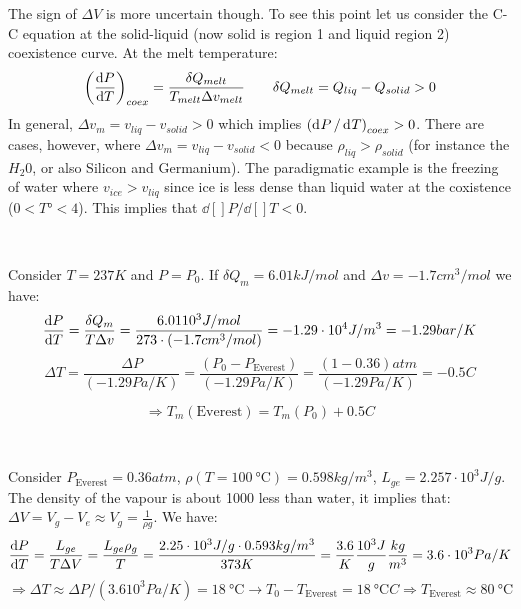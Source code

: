 \documentclass[../main/main.tex]{subfiles}
\begin{document}
The sign of \( \Delta V \) is more uncertain though. To see this point let us consider the C-C equation at the solid-liquid (now solid is region 1 and liquid region 2) coexistence curve.
At the melt temperature:
\begin{equation}
  \qty(\dv{P}{T} )_{coex} = \frac{\delta Q_{melt}}{T_{melt}\Delta v_{melt}} \qquad \delta Q_{melt} = Q_{liq} - Q_{solid} > 0
  \label{eq:}
\end{equation}
In general, \( \Delta v_m = v_{liq} - v_{solid} > 0 \) which implies \( \qty( \dd[]{P}/\dd[]{T}   )_{coex} > 0  \). There are cases, however, where \( \Delta v_m = v_{liq} - v_{solid} < 0 \) because \( \rho_{liq} > \rho _{solid} \) (for instance the \( H_2 0 \), or also Silicon and Germanium). The paradigmatic example is the freezing of water where \( v_{ice} > v_{liq} \) since ice is less dense than liquid water at the coxistence (\( 0 < T° < 4 \)). This implies that \( \dd[]{P}/\dd[]{T} < 0   \).

\begin{example} \

Consider \( T = 237 K \) and \( P=P_0 \). If \( \delta Q_m = 6.01 kJ/mol \) and \( \Delta v = -1.7 cm^3 /mol  \) we have:
\begin{equation*}
  \dv{P}{T}  = \frac{\delta Q_m}{T \Delta v} = \frac{6.01 10^3 J/mol}{273 \cdot (-1.7 cm^3/mol)} = -1.29 \cdot 10^4 J/m^3 = -1.29 bar/K
  \label{eq:}
\end{equation*}
\begin{equation*}
  \Delta T = \frac{\Delta P}{(-1.29 Pa/K)} = \frac{(P_0 - P_{\text{Everest}})}{(-1.29 Pa/K)} = \frac{(1-0.36)atm}{(-1.29 Pa/K)} = -0.5 C
  \label{eq:}
\end{equation*}
\end{example}
\begin{equation*}
  \Rightarrow T_m ( \text{Everest}) = T_m (P_0) + 0.5 C
  \label{eq:}
\end{equation*}
\begin{example} \

Consider \( P_{\text{Everest}}= 0.36 atm \), \( \rho (T= 100\SI{}{\celsius})=0.598 kg/m^3 \), \( L_{ge} = 2.257 \cdot 10^3 J/g \). The density of the vapour is about 1000 less than water, it implies that: \( \Delta V = V_g - V_e \approx V_g = \frac{1}{\rho g}\). We have:
\begin{equation*}
  \dv{P}{T} = \frac{L_{ge}}{T \Delta V} = \frac{L_{ge} \rho _g}{T} = \frac{2.25 \cdot 10^3 J/g \cdot 0.593 kg/m^3}{373 K} = \frac{3.6}{K} \frac{10^3 J}{g} \frac{kg}{m^3} = 3.6 \cdot 10^3 Pa/K
  \label{eq:}
\end{equation*}
\begin{equation*}
  \Rightarrow \Delta T \approx \Delta P/(3.6 10^3 Pa/K) = 18 \SI{}{\celsius}   \rightarrow T_0 - T_{\text{Everest}} = 18\SI{}{\celsius} C \Rightarrow T_{\text{Everest}}\approx 80\SI{}{\celsius}
  \label{eq:}
\end{equation*}
\end{example}
\end{document}
